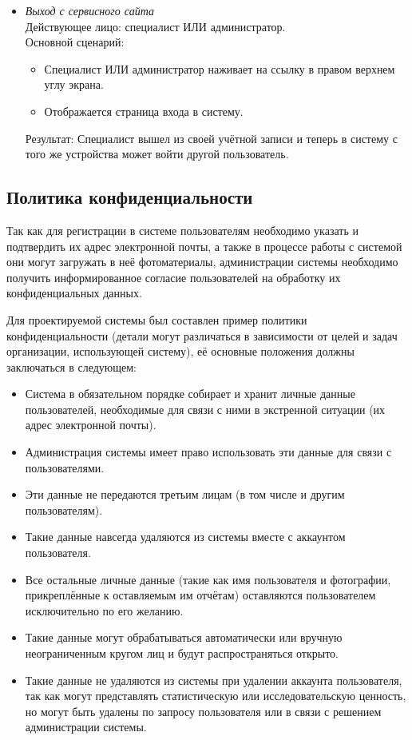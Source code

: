 \begin{itemize}[topsep=0pt, parsep=0pt, itemsep=0pt, leftmargin=*, labelindent=0.5cm]
	\item \textit{Выход с сервисного сайта} \\
	Действующее лицо: специалист ИЛИ администратор. \\
	Основной сценарий:
	\begin{itemize}[topsep=0pt, parsep=0pt, itemsep=0pt, leftmargin=*, labelindent=0.5cm]
		\item Специалист ИЛИ администратор наживает на ссылку  в правом верхнем углу экрана.
		\item Отображается страница входа в систему.
	\end{itemize}
	Результат: Специалист вышел из своей учётной записи и теперь в систему с того же устройства может войти другой пользователь.
\end{itemize}

\subsection{Политика конфиденциальности}

\tab
Так как для регистрации в системе пользователям необходимо указать и подтвердить их адрес электронной почты, а также в процессе работы с системой они могут загружать в неё фотоматериалы, администрации системы необходимо получить информированное согласие пользователей на обработку их конфиденциальных данных\cite{privacy-policy}.

\tab
Для проектируемой системы был составлен пример политики конфиденциальности (детали могут различаться в зависимости от целей и задач организации, использующей систему), её основные положения должны заключаться в следующем:
\begin{itemize}
	\item Система в обязательном порядке собирает и хранит личные данные пользователей, необходимые для связи с ними в экстренной ситуации (их адрес электронной почты).
	\item Администрация системы имеет право использовать эти данные для связи с пользователями.
	\item Эти данные не передаются третьим лицам (в том числе и другим пользователям).
	\item Такие данные навсегда удаляются из системы вместе с аккаунтом пользователя.
	\item Все остальные личные данные (такие как имя пользователя и фотографии, прикреплённые к оставляемым им отчётам) оставляются пользователем исключительно по его желанию.
	\item Такие данные могут обрабатываться автоматически или вручную неограниченным кругом лиц и будут распространяться открыто.
	\item Такие данные не удаляются из системы при удалении аккаунта пользователя, так как могут представлять статистическую или исследовательскую ценность, но могут быть удалены по запросу пользователя или в связи с решением администрации системы.
\end{itemize}

